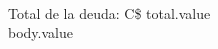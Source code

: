 \documentclass[12pt]{article}
\newcommand{\totalValue}{total.value}
\begin{document}
    \\
    Total de la deuda: C\$ \totalValue\\
    
    body.value
\end{document}
